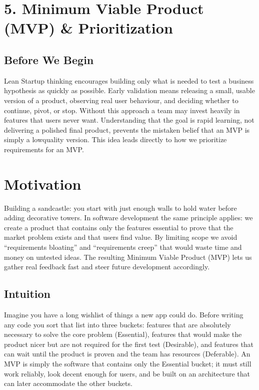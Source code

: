 \documentclass[12pt, a4paper]{article}
\begin{document}
\newpage

\section{5. Minimum Viable Product (MVP) \& Prioritization}
\subsection{Before We Begin}
Lean Startup thinking encourages building only what is needed to test a business hypothesis as quickly as possible. Early validation means releasing a small, usable version of a product, observing real user behaviour, and deciding whether to continue, pivot, or stop. Without this approach a team may invest heavily in features that users never want. Understanding that the goal is rapid learning, not delivering a polished final product, prevents the mistaken belief that an MVP is simply a lowquality version. This idea leads directly to how we prioritize requirements for an MVP.  

\section{Motivation}
Building a sandcastle: you start with just enough walls to hold water before adding decorative towers. In software development the same principle applies: we create a product that contains only the features essential to prove that the market problem exists and that users find value. By limiting scope we avoid ``requirements bloating'' and ``requirements creep'' that would waste time and money on untested ideas. The resulting Minimum Viable Product (MVP) lets us gather real feedback fast and steer future development accordingly.  

\subsection{Intuition}
Imagine you have a long wishlist of things a new app could do. Before writing any code you sort that list into three buckets: features that are absolutely necessary to solve the core problem (Essential), features that would make the product nicer but are not required for the first test (Desirable), and features that can wait until the product is proven and the team has resources (Deferable). An MVP is simply the software that contains only the Essential bucket; it must still work reliably, look decent enough for users, and be built on an architecture that can later accommodate the other buckets.  
\end{document}
